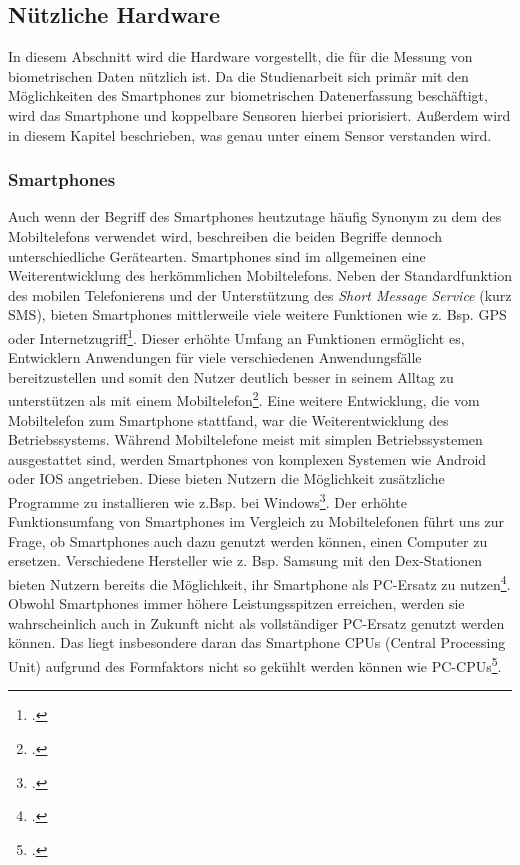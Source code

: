 \subsection{Nützliche Hardware}
In diesem Abschnitt wird die Hardware vorgestellt, die für die Messung von biometrischen Daten nützlich ist. Da die Studienarbeit sich primär mit den Möglichkeiten des Smartphones zur biometrischen Datenerfassung beschäftigt, wird das Smartphone und koppelbare Sensoren hierbei priorisiert. Außerdem wird in diesem Kapitel beschrieben, was genau unter einem Sensor verstanden wird.
\subsubsection{Smartphones}
Auch wenn der Begriff des Smartphones heutzutage häufig Synonym zu dem des Mobiltelefons verwendet wird, beschreiben die beiden Begriffe dennoch unterschiedliche Gerätearten. Smartphones sind im allgemeinen eine Weiterentwicklung des herkömmlichen Mobiltelefons. Neben der Standardfunktion des mobilen Telefonierens und der Unterstützung des \textit{Short Message Service} (kurz SMS), bieten Smartphones mittlerweile viele weitere Funktionen wie z. Bsp. GPS oder Internetzugriff\footcite[Vgl. ][S.3 Z.5ff]{Bou11}.\newline
Dieser erhöhte Umfang an Funktionen ermöglicht es, Entwicklern Anwendungen für viele verschiedenen Anwendungsfälle bereitzustellen und somit den Nutzer deutlich besser in seinem Alltag zu unterstützen als mit einem Mobiltelefon\footcite[Vgl. ][Smartphones are tiny Computers]{Ada18}. Eine weitere Entwicklung, die vom Mobiltelefon zum Smartphone stattfand, war die Weiterentwicklung des Betriebssystems. Während Mobiltelefone meist mit simplen Betriebssystemen ausgestattet sind, werden Smartphones von komplexen Systemen wie Android oder IOS angetrieben. Diese bieten Nutzern die Möglichkeit zusätzliche Programme zu installieren wie z.Bsp. bei Windows\footcite[Vgl. ][Mobile Operating Systems]{Ada18}.\newline
Der erhöhte Funktionsumfang von Smartphones im Vergleich zu Mobiltelefonen führt uns zur Frage, ob Smartphones auch dazu genutzt werden können, einen Computer zu ersetzen. Verschiedene Hersteller wie z. Bsp. Samsung mit den Dex-Stationen bieten Nutzern bereits die Möglichkeit, ihr Smartphone als PC-Ersatz zu nutzen\footcite{Kai18}. Obwohl Smartphones immer höhere Leistungsspitzen erreichen, werden sie wahrscheinlich auch in Zukunft nicht als vollständiger PC-Ersatz genutzt werden können. Das liegt insbesondere daran das Smartphone CPUs (Central Processing Unit) aufgrund des Formfaktors nicht so gekühlt werden können wie PC-CPUs\footcite[Vgl. ][Power and Heat]{Gav18}.\newline 
